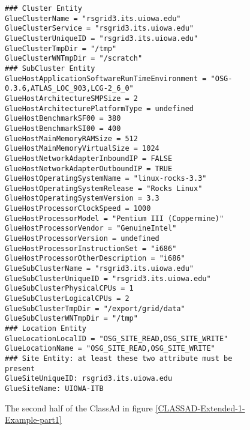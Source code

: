 \documentclass[12pt]{article}
\begin{document}
\begin{figure}
\scriptsize
\begin{verbatim}
### Cluster Entity
GlueClusterName = "rsgrid3.its.uiowa.edu"
GlueClusterService = "rsgrid3.its.uiowa.edu"
GlueClusterUniqueID = "rsgrid3.its.uiowa.edu"
GlueClusterTmpDir = "/tmp"
GlueClusterWNTmpDir = "/scratch"
### SubCluster Entity
GlueHostApplicationSoftwareRunTimeEnvironment = "OSG-0.3.6,ATLAS_LOC_903,LCG-2_6_0"
GlueHostArchitectureSMPSize = 2
GlueHostArchitecturePlatformType = undefined
GlueHostBenchmarkSF00 = 380
GlueHostBenchmarkSI00 = 400
GlueHostMainMemoryRAMSize = 512
GlueHostMainMemoryVirtualSize = 1024
GlueHostNetworkAdapterInboundIP = FALSE
GlueHostNetworkAdapterOutboundIP = TRUE
GlueHostOperatingSystemName = "linux-rocks-3.3"
GlueHostOperatingSystemRelease = "Rocks Linux"
GlueHostOperatingSystemVersion = 3.3
GlueHostProcessorClockSpeed = 1000
GlueHostProcessorModel = "Pentium III (Coppermine)"
GlueHostProcessorVendor = "GenuineIntel"
GlueHostProcessorVersion = undefined
GlueHostProcessorInstructionSet = "i686"
GlueHostProcessorOtherDescription = "i686"
GlueSubClusterName = "rsgrid3.its.uiowa.edu"
GlueSubClusterUniqueID = "rsgrid3.its.uiowa.edu"
GlueSubClusterPhysicalCPUs = 1
GlueSubClusterLogicalCPUs = 2
GlueSubClusterTmpDir = "/export/grid/data"
GlueSubClusterWNTmpDir = "/tmp"
### Location Entity
GlueLocationLocalID = "OSG_SITE_READ,OSG_SITE_WRITE"
GlueLocationName = "OSG_SITE_READ,OSG_SITE_WRITE"
### Site Entity: at least these two attribute must be present
GlueSiteUniqueID: rsgrid3.its.uiowa.edu
GlueSiteName: UIOWA-ITB
\end{verbatim}
\normalsize \caption[Example of an old ClassAd representation of the
GLUE Schema]{\label{CLASSAD-Extended-1-Example-part2} The second
half of the ClassAd in figure
\ref{CLASSAD-Extended-1-Example-part1}}
\end{figure}
\end{document}
